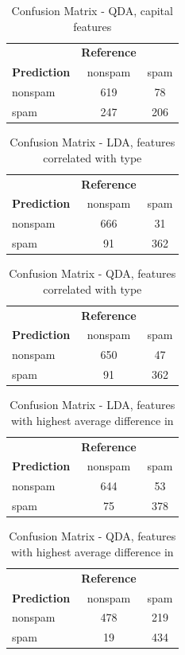 \documentclass{article}\usepackage[]{graphicx}\usepackage[]{xcolor}
\begin{document}
\begin{table}[h]
	\centering
	\begin{tabular}{lcc}
		& \textbf{Reference} & \\
		\textbf{Prediction} & nonspam & spam \\
		nonspam & 619 & 78 \\
		spam & 247 & 206 \\
	\end{tabular}
	\caption{Confusion Matrix - QDA, capital features}
	\label{tab:confusion_matrix_qda3}
\end{table}
\begin{table}[h]
	\centering
	\begin{tabular}{lcc}
		& \textbf{Reference} & \\
		\textbf{Prediction} & nonspam & spam \\
		nonspam & 666 & 31 \\
		spam & 91 & 362 \\
	\end{tabular}
	\caption{Confusion Matrix - LDA, features correlated with type}
	\label{tab:confusion_matrix_lda4}
\end{table}

\begin{table}[h]
	\centering
	\begin{tabular}{lcc}
		& \textbf{Reference} & \\
		\textbf{Prediction} & nonspam & spam \\
		nonspam & 650 & 47 \\
		spam & 91 & 362 \\
	\end{tabular}
	\caption{Confusion Matrix - QDA, features correlated with type}
	\label{tab:confusion_matrix_qda4}
\end{table}
\begin{table}[h]
 	\centering
 	\begin{tabular}{lcc}
 		& \textbf{Reference} & \\
 		\textbf{Prediction} & nonspam & spam \\
 		nonspam & 644 & 53 \\
 		spam & 75 & 378 \\
 	\end{tabular}
 	\caption{Confusion Matrix - LDA, features with highest average difference in}
 	\label{tab:confusion_matrix_lda5}
 \end{table}
 
 \begin{table}[h]
 	\centering
 	\begin{tabular}{lcc}
 		& \textbf{Reference} & \\
 		\textbf{Prediction} & nonspam & spam \\
 		nonspam & 478 & 219 \\
 		spam & 19 & 434 \\
 	\end{tabular}
 	\caption{Confusion Matrix - QDA, features with highest average difference in}
 	\label{tab:confusion_matrix_qda5}
\end{table}
\end{document}
